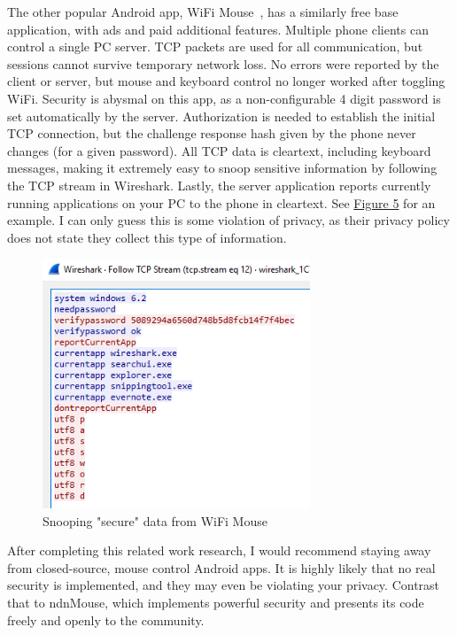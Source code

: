 \documentclass{sig-alternate}
\renewcommand\_{\textunderscore\allowbreak}  %
\begin{document}
The other popular Android app, WiFi Mouse~\cite{wifimouse}, has a similarly free base application, with ads and paid additional features. Multiple phone clients can control a single PC server. TCP packets are used for all communication, but sessions cannot survive temporary network loss. No errors were reported by the client or server, but mouse and keyboard control no longer worked after toggling WiFi. Security is abysmal on this app, as a non-configurable 4 digit password is set automatically by the server. Authorization is needed to establish the initial TCP connection, but the challenge response hash given by the phone never changes (for a given password). All TCP data is cleartext, including keyboard messages, making it extremely easy to snoop sensitive information by following the TCP stream in Wireshark. Lastly, the server application reports currently running applications on your PC to the phone in cleartext. See \hyperlink{fig:snoop}{Figure 5} for an example. I can only guess this is some violation of privacy, as their privacy policy does not state they collect this type of information.

\begin{figure}
	\centering
	\hypertarget{fig:snoop}{}
	\includegraphics[width=8cm]{screenshots/snoop.png}
	\caption{Snooping "secure" data from WiFi Mouse}
\end{figure}

After completing this related work research, I would recommend staying away from closed-source, mouse control Android apps. It is highly likely that no real security is implemented, and they may even be violating your privacy. Contrast that to ndnMouse, which implements powerful security and presents its code freely and openly to the community.

\end{document}

